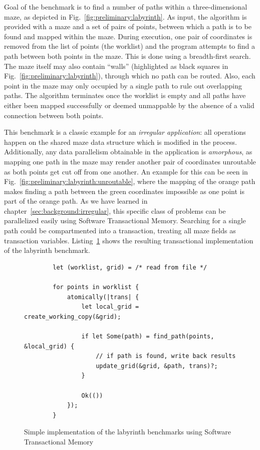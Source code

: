 Goal of the benchmark is to find a number of paths within a three-dimensional maze, as depicted in Fig.~\ref{fig:preliminary:labyrinth}.
As input, the algorithm is provided with a maze and a set of pairs of points, between which a path is to be found and mapped within the maze.
During execution, one pair of coordinates is removed from the list of points (the worklist) and the program attempts to find a path between both points in the maze.
This is done using a breadth-first search.
The maze itself may also contain \enquote{walls} (highlighted as black squares in Fig.~\ref{fig:preliminary:labyrinth}), through which no path can be routed.
Also, each point in the maze may only occupied by a single path to rule out overlapping paths.
The algorithm terminates once the worklist is empty and all paths have either been mapped successfully or deemed unmappable by the absence of a valid connection between both points.

This benchmark is a classic example for an \emph{irregular application}: all operations happen on the shared maze data structure which is modified in the process.
Additionally, any data parallelism obtainable in the application is \emph{amorphous}, as mapping one path in the maze may render another pair of coordinates unroutable as both points get cut off from one another.
An example for this can be seen in Fig.~\ref{fig:preliminary:labyrinth:unroutable}, where the mapping of the orange path makes finding a path between the green coordinates impossible as one point is part of the orange path.
As we have learned in chapter~\ref{sec:background:irregular}, this specific class of problems can be parallelized easily using Software Transactional Memory.
Searching for a single path could be compartmented into a transaction, treating all maze fields as transaction variables.
Listing~\ref{fig:preliminaries:stm} shows the resulting transactional implementation of the labyrinth benchmark.

\begin{figure}[t]
    \begin{verbatim}
        let (worklist, grid) = /* read from file */

        for points in worklist {
            atomically(|trans| {
                let local_grid = create_working_copy(&grid);

                if let Some(path) = find_path(points, &local_grid) {
                    // if path is found, write back results
                    update_grid(&grid, &path, trans)?;
                }

                Ok(())
            });
        }
    \end{verbatim}
    \caption{Simple implementation of the labyrinth benchmarks using Software Transactional Memory}%
    \label{fig:preliminaries:stm}
\end{figure}

